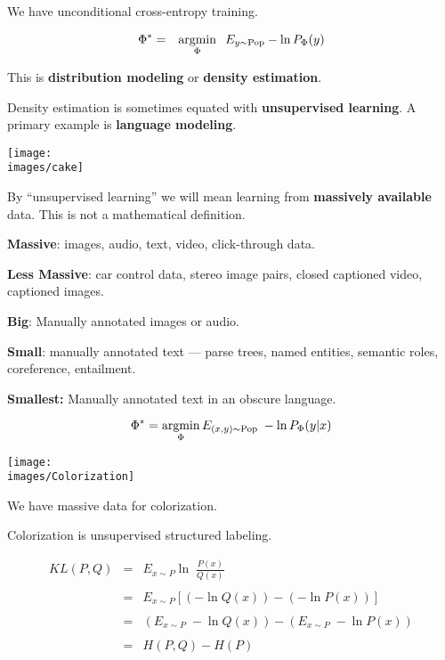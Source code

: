 {{\vfill
We have unconditional cross-entropy training.

\begin{eqnarray*}
  \Phi^* & = & \operatorname*{argmin}_\Phi \;\;E_{y \sim \mathrm{Pop}}  -\ln P_\Phi(y)
\end{eqnarray*}

\vfill
This is {\bf distribution modeling} or {\bf density estimation}.

\vfill
Density estimation is sometimes equated with {\bf unsupervised learning}.  A primary example is {\bf language modeling}.


\centerline{\texttt{[image: \\images/cake]}}



By ``unsupervised learning'' we will mean learning from {\bf massively available} data.  This is not a mathematical definition.

\vfill
{\bf Massive}: images, audio, text, video, click-through data.

\vfill
{\bf Less Massive}: car control data, stereo image pairs, closed captioned video, captioned images.

\vfill
{\bf Big}: Manually annotated images or audio.

\vfill
{\bf Small}: manually annotated text --- parse trees, named entities, semantic roles, coreference, entailment.

\vfill
{\bf Smallest:} Manually annotated text in an obscure language.


$$\Phi^* = \operatorname*{argmin}_\Phi E_{(x,y) \sim \mathrm{Pop}}\;-\ln P_\Phi(y|x)$$

\vfill
\centerline{\texttt{[image: \\images/Colorization]}}

\vfill
We have massive data for colorization.

\vfill
Colorization is unsupervised structured labeling.
}



\begin{eqnarray*}
KL(P,Q) & = & E_{x \sim P} \ln \;\frac{P(x)}{Q(x)} \\
\\
& = & E_{x \sim P} \left[(- \ln Q(x)) - (- \ln P(x))\right] \\
\\
& = & (E_{x\sim P} \;-\ln Q(x)) - (E_{x \sim P}\;-\ln P(x)) \\
\\
& = & H(P,Q) - H(P)
\end{eqnarray*}

}
